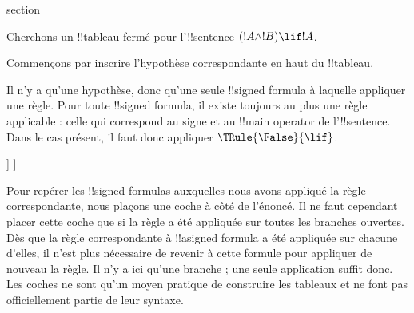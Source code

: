 \documentclass[11pt,a4paper,openany]{memoir}
\begin{document}
\endgroup



\begingroup
\expandafter\def\csname ol@sectioncs\endcsname{section}
\def\olfilename{proving-things}


      {}
      {}


\begin{ex}
Cherchons un !!{tableau} fermé pour l'!!{sentence}
$(!A \land !B) \lif !A$.

Commençons par inscrire l'hypothèse correspondante en haut du
!!{tableau}.
\begin{oltableau}
  [\sFmla{\False}{(\formula{A} \land \formula{B}) \lif \formula{A}},
    just = \TAss]
\end{oltableau}

Il n'y a qu'une hypothèse, donc qu'une seule !!{signed formula} à
laquelle appliquer une règle. Pour toute !!{signed formula}, il existe
toujours au plus une règle applicable : celle qui correspond au signe
et au !!{main operator} de l'!!{sentence}. Dans le cas présent, il faut
donc appliquer $\TRule{\False}{\lif}$.
\begin{oltableau}
  [\sFmla{\False}{(\formula{A} \land \formula{B}) \lif \formula{A}},
    checked, just = \TAss
    [\sFmla{\True}{\formula{A} \land \formula{B}},
      just={\TRule{\False}{\lif}[1]}
      [\sFmla{\False}{\formula{A}}, just={\TRule{\False}{\lif}[1]}]
    ]
  ]
\end{oltableau}
Pour repérer les !!{signed formula}s auxquelles nous avons appliqué la
règle correspondante, nous plaçons une coche à côté de l'énoncé. Il ne
faut cependant placer cette coche que si la règle a été appliquée sur
toutes les branches ouvertes. Dès que la règle correspondante à
!!a{signed formula} a été appliquée sur chacune d'elles, il n'est plus
nécessaire de revenir à cette formule pour appliquer de nouveau la
règle. Il n'y a ici qu'une branche ; une seule application suffit donc.
Les coches ne sont qu'un moyen pratique de construire les tableaux et
ne font pas officiellement partie de leur syntaxe.


\end{ex}
\end{document}
